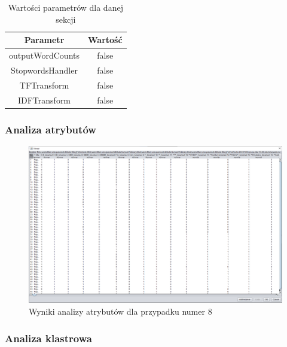 \documentclass[../EDI_Task2_Karwowski_Kowalewski.tex]{subfiles}
\begin{document}
{{        \begin{table}[!htbp]
            \small
            \centering
            \begin{tabular}{|c|c|}
                \hline
                Parametr & Wartość \\ \hline
                outputWordCounts & false \\ \hline
                StopwordsHandler & false \\ \hline
                TFTransform & false \\ \hline
                IDFTransform & false \\ \hline
            \end{tabular}
            \caption{Wartości parametrów dla danej sekcji}
        \end{table}
        \FloatBarrier

        \subsubsection{Analiza atrybutów} {

            \begin{figure}[!htbp]
                \centering
                \includegraphics[width=\textwidth]{img/results1/ftims-case8.png}
                \caption{Wyniki analizy atrybutów dla przypadku numer 8}
            \end{figure}
            \FloatBarrier
        }

        \subsubsection{Analiza klastrowa} {

}}}
\end{document}
